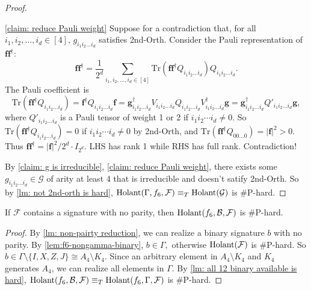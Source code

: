 \begin{proof}
\begin{claimproof}{\cref{claim: reduce Pauli weight}}
        Suppose for a contradiction that, for all $i_1,i_2,\ldots, i_d\in [4]$, $g_{i_1i_2\ldots i_d}$ satisfies {\sc 2nd-Orth}.
        Consider the Pauli representation of $\mathbf{ff}^\dagger:$
        \begin{equation*}
            \mathbf{ff^\dagger}=\frac{1}{2^d}\sum_{i_1,i_2,\ldots,i_d\in[4]}\mathrm{Tr}(\mathbf{ff}^\dagger Q_{i_1i_2\ldots i_d})Q_{i_1i_2\ldots i_d}.
        \end{equation*}
        The Pauli coefficient is
        \begin{equation*}
            \mathrm{Tr}(\mathbf{ff}^\dagger Q_{i_1i_2\ldots i_d})=\mathbf{f}^\dagger Q_{i_1i_2\ldots i_d} \mathbf{f}=\mathbf{g}_{i_1i_2\ldots i_d}^\dagger V_{i_1i_2\ldots i_d}Q_{i_1i_2\ldots i_d}V_{i_1i_2\ldots i_d}^\dagger \mathbf{g}
            =\mathbf{g}_{i_1i_2\ldots i_d}^\dagger Q'_{i_1i_2\ldots i_d} \mathbf{g},
        \end{equation*}
        where $Q'_{i_1i_2\ldots i_d}$ is a Pauli tensor of weight 1 or 2 if $i_1i_2\cdots i_d\neq 0$.
        So $\mathrm{Tr}(\mathbf{ff}^\dagger Q_{i_1i_2\ldots i_d})=0$ if $i_1i_2\cdots i_d\neq 0$ by {\sc 2nd-Orth},
        and $\mathrm{Tr}(\mathbf{ff}^\dagger Q_{00\ldots 0})=|\mathbf{f}|^2>0.$
        Thus $\mathbf{ff}^\dagger={|\mathbf{f}|^2}/{2^d}\cdot I_{2^d}$.
        LHS has rank 1 while RHS has full rank. 
        Contradiction!
    \end{claimproof}
    By \cref{claim: g is irreducible}, \cref{claim: reduce Pauli weight}, there exists some $g_{i_1i_2\ldots i_d}\in \mathcal{G}$ of arity at least 4 that is irreducible and doesn't satify {\sc 2nd-Orth}.
    So by \cref{lm: not 2nd-orth is hard}, $\operatorname{Holant}(\Gamma, f_6, \mathcal{F})\equiv_T \operatorname{Holant}(\mathcal{G})$ is \#P-hard.
\end{proof}

\begin{lemma}\label{lm: non-parity f6 is hard}
    If $\mathcal{F}$ contains a signature with no parity, then $\operatorname{Holant}(f_6,\mathcal{B},\mathcal{F})$ is \#P-hard.
\end{lemma}

\begin{proof}
    By \cref{lm: non-pairty reduction}, we can realize a binary signature $b$ with no parity.
    By \cref{lem:f6-nongamma-binary}, $b\in\Gamma,$ otherwise $\operatorname{Holant}(\mathcal{F})$ is \#P-hard.
    So $b\in \Gamma\setminus \{I,X,Z,J\}\cong A_4 \setminus K_4.$
    Since an arbitrary element in $A_4 \setminus K_4$ and $K_4$ generates $A_4$, we can realize all elements in $\Gamma.$
    By \cref{lm: all 12 binary available is hard}, $\operatorname{Holant}(f_6,\mathcal{B},\mathcal{F})\equiv_T\operatorname{Holant}(f_6,\Gamma,\mathcal{F})$ is \#P-hard.
\end{proof}

